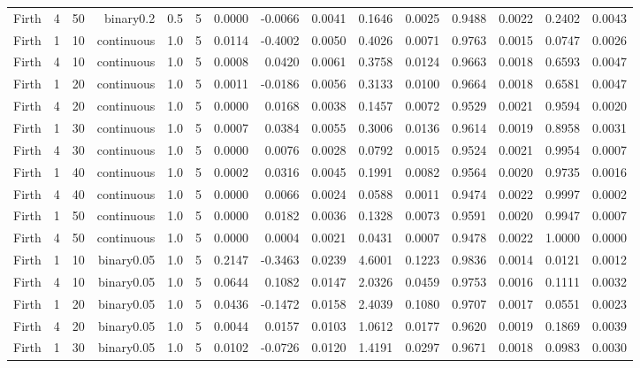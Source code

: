 \begin{longtable}{rrrrrrrrrrrrrrr}
  Firth & 4 & 50 & binary0.2 & 0.5 & 5 & 0.0000 & -0.0066 & 0.0041 & 0.1646 & 0.0025 & 0.9488 & 0.0022 & 0.2402 & 0.0043 \\ 
  Firth & 1 & 10 & continuous & 1.0 & 5 & 0.0114 & -0.4002 & 0.0050 & 0.4026 & 0.0071 & 0.9763 & 0.0015 & 0.0747 & 0.0026 \\ 
  Firth & 4 & 10 & continuous & 1.0 & 5 & 0.0008 & 0.0420 & 0.0061 & 0.3758 & 0.0124 & 0.9663 & 0.0018 & 0.6593 & 0.0047 \\ 
  Firth & 1 & 20 & continuous & 1.0 & 5 & 0.0011 & -0.0186 & 0.0056 & 0.3133 & 0.0100 & 0.9664 & 0.0018 & 0.6581 & 0.0047 \\ 
  Firth & 4 & 20 & continuous & 1.0 & 5 & 0.0000 & 0.0168 & 0.0038 & 0.1457 & 0.0072 & 0.9529 & 0.0021 & 0.9594 & 0.0020 \\ 
  Firth & 1 & 30 & continuous & 1.0 & 5 & 0.0007 & 0.0384 & 0.0055 & 0.3006 & 0.0136 & 0.9614 & 0.0019 & 0.8958 & 0.0031 \\ 
  Firth & 4 & 30 & continuous & 1.0 & 5 & 0.0000 & 0.0076 & 0.0028 & 0.0792 & 0.0015 & 0.9524 & 0.0021 & 0.9954 & 0.0007 \\ 
  Firth & 1 & 40 & continuous & 1.0 & 5 & 0.0002 & 0.0316 & 0.0045 & 0.1991 & 0.0082 & 0.9564 & 0.0020 & 0.9735 & 0.0016 \\ 
  Firth & 4 & 40 & continuous & 1.0 & 5 & 0.0000 & 0.0066 & 0.0024 & 0.0588 & 0.0011 & 0.9474 & 0.0022 & 0.9997 & 0.0002 \\ 
  Firth & 1 & 50 & continuous & 1.0 & 5 & 0.0000 & 0.0182 & 0.0036 & 0.1328 & 0.0073 & 0.9591 & 0.0020 & 0.9947 & 0.0007 \\ 
  Firth & 4 & 50 & continuous & 1.0 & 5 & 0.0000 & 0.0004 & 0.0021 & 0.0431 & 0.0007 & 0.9478 & 0.0022 & 1.0000 & 0.0000 \\ 
  Firth & 1 & 10 & binary0.05 & 1.0 & 5 & 0.2147 & -0.3463 & 0.0239 & 4.6001 & 0.1223 & 0.9836 & 0.0014 & 0.0121 & 0.0012 \\ 
  Firth & 4 & 10 & binary0.05 & 1.0 & 5 & 0.0644 & 0.1082 & 0.0147 & 2.0326 & 0.0459 & 0.9753 & 0.0016 & 0.1111 & 0.0032 \\ 
  Firth & 1 & 20 & binary0.05 & 1.0 & 5 & 0.0436 & -0.1472 & 0.0158 & 2.4039 & 0.1080 & 0.9707 & 0.0017 & 0.0551 & 0.0023 \\ 
  Firth & 4 & 20 & binary0.05 & 1.0 & 5 & 0.0044 & 0.0157 & 0.0103 & 1.0612 & 0.0177 & 0.9620 & 0.0019 & 0.1869 & 0.0039 \\ 
  Firth & 1 & 30 & binary0.05 & 1.0 & 5 & 0.0102 & -0.0726 & 0.0120 & 1.4191 & 0.0297 & 0.9671 & 0.0018 & 0.0983 & 0.0030 \\ 

\end{longtable}
